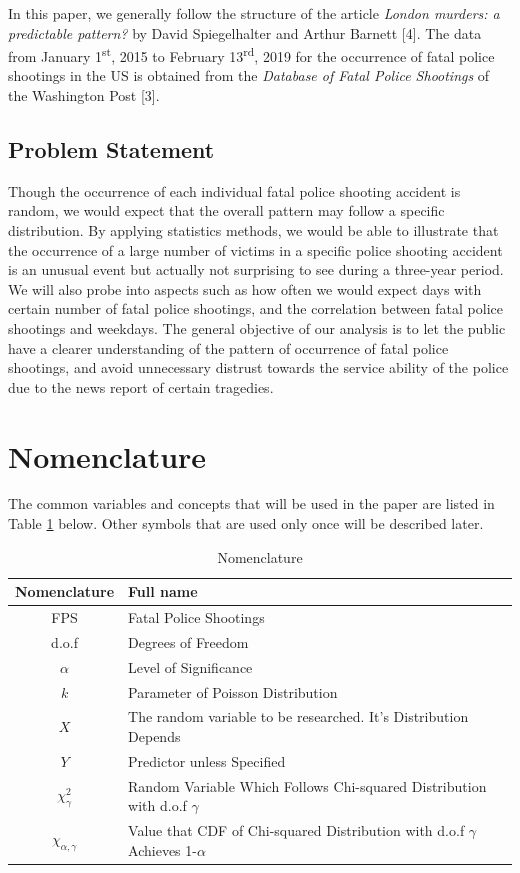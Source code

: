 \documentclass[a4paper]{article}
\begin{document}
{{In this paper, we generally follow the structure of the article \emph{London murders: a predictable pattern?} by David Spiegelhalter and Arthur Barnett [4]. The data from January 1\textsuperscript{st}, 2015 to February 13\textsuperscript{rd}, 2019 for the occurrence of fatal police shootings in the US is obtained from the \emph{Database of Fatal Police Shootings} of the Washington Post [3].

\subsection{Problem Statement}
Though the occurrence of each individual fatal police shooting accident is random, we would expect that the overall pattern may follow a specific distribution. By applying statistics methods, we would be able to illustrate that the occurrence of a large number of victims in a specific police shooting accident is an unusual event but actually not surprising to see during a three-year period. We will also probe into aspects such as how often we would expect days with certain number of fatal police shootings, and the correlation between fatal police shootings and weekdays. The general objective of our analysis is to let the public have a clearer understanding of the pattern of occurrence of fatal police shootings, and avoid unnecessary distrust towards the service ability of the police due to the news report of certain tragedies.

\newpage
\section{Nomenclature} 
The common variables and concepts that will be used in the paper are listed in Table \ref{NOC} below. Other symbols that are used only once will be described later.
\begin{table}[H]
    \centering
    \begin{tabular}{cl}
         \hline
\textbf{Nomenclature}& \textbf{Full name} \\
\hline\hline
FPS & Fatal Police Shootings\\
d.o.f & Degrees of Freedom\\

$\alpha$ & Level of Significance\\
$k$ & Parameter of Poisson Distribution\\
$X$ & The random variable to be researched. It's Distribution Depends\\
$Y$ & Predictor unless Specified\\
$\chi_{\gamma}^2$ & Random Variable Which Follows Chi-squared Distribution with d.o.f $\gamma$\\
$\chi_{\alpha,\gamma}$ & Value that CDF of Chi-squared Distribution with d.o.f $\gamma$ Achieves 1-$\alpha$\\
\hline
    \end{tabular}
    \centering
    \caption{Nomenclature}
    \label{NOC}
\end{table}

}}
\end{document}
